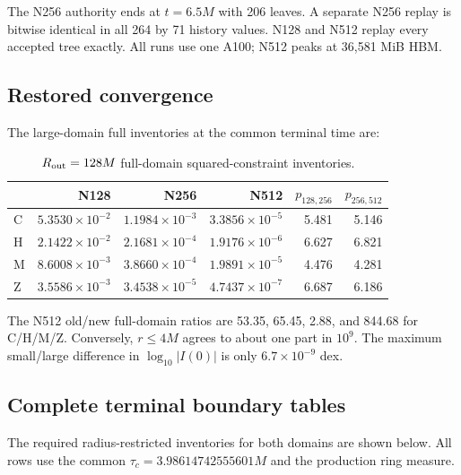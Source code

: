 \documentclass[11pt]{article}
\begin{document}
The N256 authority ends at $t=6.5M$ with 206 leaves. A separate N256 replay is
bitwise identical in all 264 by 71 history values. N128 and N512 replay every
accepted tree exactly. All runs use one A100; N512 peaks at 36,581 MiB HBM.

\subsection{Restored convergence}

The large-domain full inventories at the common terminal time are:

\begin{table}[H]\centering\small
\begin{tabular}{lrrrrr}
\toprule
 & N128 & N256 & N512 & $p_{128,256}$ & $p_{256,512}$\\
\midrule
C & $5.3530{\times}10^{-2}$ & $1.1984{\times}10^{-3}$ & $3.3856{\times}10^{-5}$ & 5.481 & 5.146\\
H & $2.1422{\times}10^{-2}$ & $2.1681{\times}10^{-4}$ & $1.9176{\times}10^{-6}$ & 6.627 & 6.821\\
M & $8.6008{\times}10^{-3}$ & $3.8660{\times}10^{-4}$ & $1.9891{\times}10^{-5}$ & 4.476 & 4.281\\
Z & $3.5586{\times}10^{-3}$ & $3.4538{\times}10^{-5}$ & $4.7437{\times}10^{-7}$ & 6.687 & 6.186\\
\bottomrule
\end{tabular}
\caption{$R_{\rm out}=128M$ full-domain squared-constraint inventories.}
\end{table}

The N512 old/new full-domain ratios are 53.35, 65.45, 2.88, and 844.68 for
C/H/M/Z. Conversely, $r\le4M$ agrees to about one part in $10^9$. The maximum
small/large difference in $\log_{10}|I(0)|$ is only
$6.7\times10^{-9}$ dex.

\subsection{Complete terminal boundary tables}

The required radius-restricted inventories for both domains are shown below.
All rows use the common $\tau_c=3.98614742555601M$ and the production ring
measure.
\end{document}
